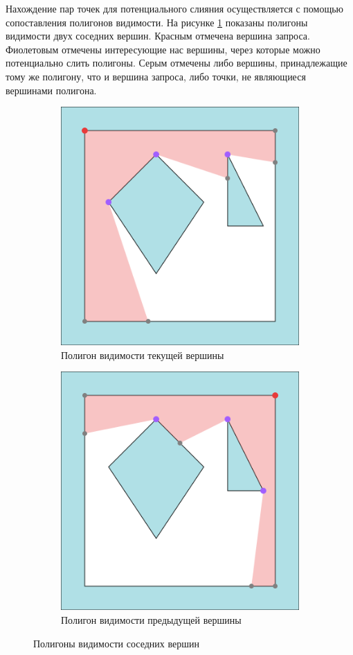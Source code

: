 \documentclass{fefu_thesis/cls/fefu}
\begin{document}
    Нахождение пар точек для потенциального слияния осуществляется с помощью сопоставления полигонов видимости. На рисунке \ref{VP} показаны полигоны видимости двух соседних вершин. Красным отмечена вершина запроса. Фиолетовым отмечены интересующие нас вершины, через которые можно потенциально слить полигоны. Серым отмечены либо вершины, принадлежащие тому же полигону, что и вершина запроса, либо точки, не являющиеся вершинами полигона.

    \begin{figure}[H]
        \centering
        \begin{subfigure}[t]{0.49\linewidth}
            \centering
            \includegraphics[scale=0.5]{images/visibility_polygon_current_vertex.png}
            \caption{Полигон видимости текущей вершины}
        \end{subfigure}
        \begin{subfigure}[t]{0.49\linewidth}
            \centering
            \includegraphics[scale=0.5]{images/visibility_polygon_prev_vertex.png}
            \caption{Полигон видимости предыдущей вершины}
        \end{subfigure}
        \caption{Полигоны видимости соседних вершин}
        \label{VP}
    \end{figure}
\end{document}
